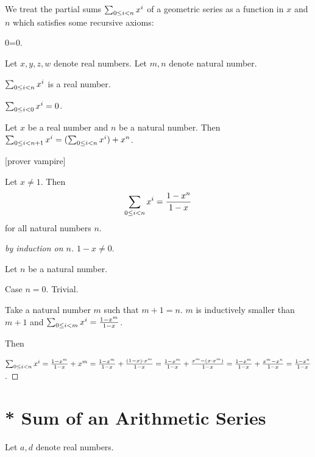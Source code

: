 \documentclass{article}
\begin{document}
We treat the partial sums $\sumgeom{x}{n}$ of a geometric
series as a function in $x$ and $n$ which satisfies some
recursive axioms:

\begin{lemma} 0=0. \end{lemma}

Let $x,y,z,w$ denote real numbers. 
Let $m,n$ denote natural number.




\begin{signature}
$\sumgeom{x}{n}$ is a real number.
\end{signature}

\begin{axiom}
$\sumgeom{x}{0} = 0$.
\end{axiom}

\begin{axiom} Let $x$ be a real number and $n$ be
a natural number. Then 
$\sumgeom{x}{n+1} = (\sumgeom{x}{n}) + x^{n}$.
\end{axiom}

[prover vampire]

\begin{theorem} Let $x \neq 1$. Then
$$\sumgeom{x}{n} = \frac{1 - x^{n}}{1 - x}$$
for all natural numbers $n$.
\end{theorem}
\begin{proof}[by induction on $n$]

$1 - x \neq 0$.

Let $n$ be a natural number.

Case $n = 0$. Trivial.

Take a natural number $m$ such that $m + 1 = n$. 
$m$ is inductively smaller than $m+1$ and
$\sumgeom{x}{m} = \frac{1 - x^{m}}{1 - x}$.

Then

$\sumgeom{x}{n} =
\frac{1 - x^{m}}{1 - x} + x^{m} = 
\frac{1 - x^{m}}{1 - x} + \frac{(1-x)\cdot x^{m}}{1 - x} =
\frac{1 - x^{m}}{1 - x} + \frac{x^{m}-(x \cdot x^{m})}{1 - x} =
\frac{1 - x^{m}}{1 - x} + \frac{x^{m} - x^{n}}{1 - x} =
\frac{1 - x^{n}}{1 - x}$.
\end{proof}

\section{* Sum of an Arithmetic Series}

\newcommand{\sumarith}[3]{\sum_{i = 1}^{#3}(#1 + #2 \cdot i)}


Let $a,d$ denote real numbers.
\end{document}
